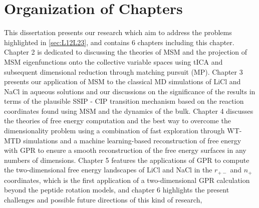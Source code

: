 \section{Organization of Chapters}

\begin{spacing}{2.0}

    This dissertation presents our research which aim to address the problems highlighted in \ref{sec:L12L23}, and contains 6 chapters including this 
    chapter. Chapter 2 is dedicated to discussing the theories of MSM and the projection of MSM eigenfunctions onto the collective variable spaces 
    using tICA and subsequent dimensional reduction through matching pursuit (MP). Chapter 3 presents our application of MSM to the classical MD 
    simulations of LiCl and NaCl in aqueous solutions and our discussions on the significance of the results in terms of the plausible SSIP - CIP 
    transition mechanism based on the reaction coordinates found using MSM and the dynamics of the bulk. Chapter 4 discusses the theories of free 
    energy computation and the best way to overcome the dimensionality problem using a combination of fast exploration through WT-MTD simulations 
    and a machine learning-based reconstruction of free energy with GPR to ensure a smooth reconstruction of the free energy surfaces in any numbers 
    of dimensions. Chapter 5 features the applications of GPR to compute the two-dimensional free energy landscapes of LiCl and NaCl in the $r_{+-}$ 
    and $n_{+}$ coordinates, which is the first application of a two-dimensional GPR calculation beyond the peptide rotation models, and chapter 6 
    highlights the present challenges and possible future directions of this kind of research,

\end{spacing}
